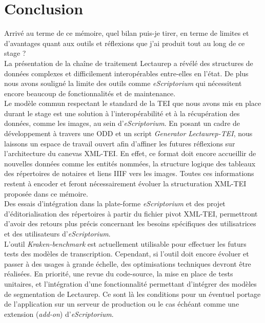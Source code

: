 \part*{Conclusion}

Arrivé au terme de ce mémoire, quel bilan puis-je tirer, en terme de limites et d'avantages quant aux outils et réflexions que j'ai produit tout au long de ce stage ?\\

La présentation de la chaîne de traitement Lectaurep a révélé des structures de données complexes et difficilement interopérables entre-elles en l'état. De plus nous avons souligné la limite des outils comme \textit{eScriptorium} qui nécessitent encore beaucoup de fonctionnalités et de maintenance.\\

Le modèle commun respectant le standard de la TEI que nous avons mis en place durant le stage est une solution à l'interopérabilité et à la récupération des données, comme les images, au sein d'\textit{eScriptorium}. En posant un cadre de développement à travers une ODD et un script \textit{Generator Lectaurep-TEI}, nous laissons un espace de travail ouvert afin d'affiner les futures réflexions sur l'architecture du canevas XML-TEI. En effet, ce format doit encore accueillir de nouvelles données comme les entités nommées, la structure logique des tableaux des répertoires de notaires et liens IIIF vers les images. Toutes ces informations restent à encoder et feront nécessairement évoluer la structuration XML-TEI proposée dans ce mémoire.\\

Des essais d'intégration dans la plate-forme \textit{eScriptorium} et des projet d'éditorialisation des répertoires à partir du fichier pivot XML-TEI, permettront d'avoir des retours plus précis concernant les besoins spécifiques des utilisatrices et des utilisateurs d'\textit{eScriptorium}.\\

L'outil \textit{Kraken-benchmark} est actuellement utilisable pour effectuer les futurs tests des modèles de transcription. Cependant, si l'outil doit encore évoluer et passer à des usages à grande échelle, des optimisations techniques devront être réalisées. En priorité, une revue du code-source, la mise en place de tests unitaires, et l'intégration d'une fonctionnalité permettant d'intégrer des modèles de segmentation de Lectaurep. Ce sont là les conditions pour un éventuel portage de l'application sur un serveur de production ou le cas échéant comme une extension (\textit{add-on}) d'\textit{eScriptorium}.\\

